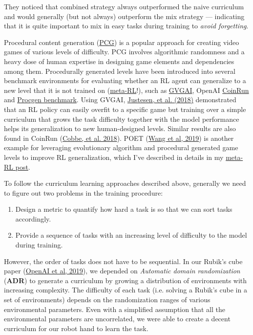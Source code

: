 They noticed that combined strategy always outperformed the naive curriculum and would generally (but not always) outperform the mix strategy --- indicating that it is quite important to mix in easy tasks during training to \emph{avoid forgetting}.

\label{pcg}{}Procedural content generation (\href{https://en.wikipedia.org/wiki/Procedural_generation}{PCG}) is a popular approach for creating video games of various levels of difficulty. PCG involves algorithmic randomness and a heavy dose of human expertise in designing game elements and dependencies among them. Procedurally generated levels have been introduced into several benchmark environments for evaluating whether an RL agent can generalize to a new level that it is not trained on (\href{https://lilianweng.github.io/posts/2019-06-23-meta-rl/}{meta-RL}!), such as \href{http://www.gvgai.net/}{GVGAI}, OpenAI \href{https://openai.com/blog/quantifying-generalization-in-reinforcement-learning/}{CoinRun} and \href{https://openai.com/blog/procgen-benchmark/}{Procgen benchmark}. Using GVGAI, \href{https://arxiv.org/abs/1806.10729}{Justesen, et al. (2018)} demonstrated that an RL policy can easily overfit to a specific game but training over a simple curriculum that grows the task difficulty together with the model performance helps its generalization to new human-designed levels. Similar results are also found in CoinRun (\href{https://arxiv.org/abs/1812.02341}{Cobbe, et al. 2018}). POET (\href{https://arxiv.org/abs/1901.01753}{Wang et al, 2019}) is another example for leveraging evolutionary algorithm and procedural generated game levels to improve RL generalization, which I've described in details in my \href{https://lilianweng.github.io/posts/2019-06-23-meta-rl/\#evolutionary-algorithm-on-environment-generation}{meta-RL post}.

To follow the curriculum learning approaches described above, generally we need to figure out two problems in the training procedure:

\begin{enumerate}
\tightlist
\item
  Design a metric to quantify how hard a task is so that we can sort tasks accordingly.
\item
  Provide a sequence of tasks with an increasing level of difficulty to the model during training.
\end{enumerate}

However, the order of tasks does not have to be sequential. In our Rubik's cube paper (\href{https://arxiv.org/abs/1910.07113.}{OpenAI et al, 2019}), we depended on \emph{Automatic domain randomization} (\textbf{ADR}) to generate a curriculum by growing a distribution of environments with increasing complexity. The difficulty of each task (i.e. solving a Rubik's cube in a set of environments) depends on the randomization ranges of various environmental parameters. Even with a simplified assumption that all the environmental parameters are uncorrelated, we were able to create a decent curriculum for our robot hand to learn the task.

